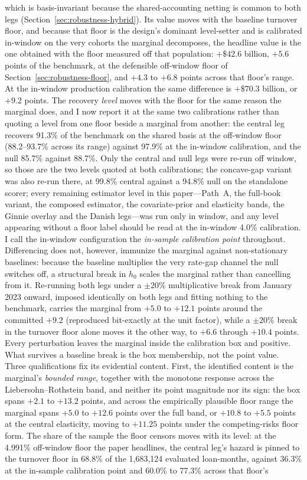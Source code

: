\documentclass[12pt]{article}
\begin{document}
which is basis-invariant because the shared-accounting netting is common to both legs (Section~\ref{sec:robustness-hybrid}). Its value moves with the baseline turnover floor, and because that floor is the design's dominant level-setter and is calibrated in-window on the very cohorts the marginal decomposes, the headline value is the one obtained with the floor measured off that population: $+\$42.6$ billion, $+5.6$ points of the benchmark, at the defensible off-window floor of Section~\ref{sec:robustness-floor}, and $+4.3$ to $+6.8$ points across that floor's range. At the in-window production calibration the same difference is $+\$70.3$ billion, or $+9.2$ points. The recovery \emph{level} moves with the floor for the same reason the marginal does, and I now report it at the same two calibrations rather than quoting a level from one floor beside a marginal from another: the central leg recovers 91.3\% of the benchmark on the shared basis at the off-window floor (88.2--93.7\% across its range) against 97.9\% at the in-window calibration, and the null 85.7\% against 88.7\%. Only the central and null legs were re-run off window, so those are the two levels quoted at both calibrations; the concave-gap variant was also re-run there, at 99.8\% central against a 94.8\% null on the standalone scorer; every remaining estimator level in this paper---Path~A, the full-book variant, the composed estimator, the covariate-prior and elasticity bands, the Ginnie overlay and the Danish legs---was run only in window, and any level appearing without a floor label should be read at the in-window 4.0\% calibration. I call the in-window configuration the \emph{in-sample calibration point} throughout. Differencing does not, however, immunize the marginal against non-stationary baselines: because the baseline multiplies the very rate-gap channel the null switches off, a structural break in $h_0$ scales the marginal rather than cancelling from it. Re-running both legs under a $\pm 20\%$ multiplicative break from January 2023 onward, imposed identically on both legs and fitting nothing to the benchmark, carries the marginal from $+5.0$ to $+12.1$ points around the committed $+9.2$ (reproduced bit-exactly at the unit factor), while a $\pm 20\%$ break in the turnover floor alone moves it the other way, to $+6.6$ through $+10.4$ points. Every perturbation leaves the marginal inside the calibration box and positive. What survives a baseline break is the box membership, not the point value. Three qualifications fix its evidential content. First, the identified content is the marginal's \emph{bounded range}, together with the monotone response across the Liebersohn--Rothstein band, and neither its point magnitude nor its sign: the box spans $+2.1$ to $+13.2$ points, and across the empirically plausible floor range the marginal spans $+5.0$ to $+12.6$ points over the full band, or $+10.8$ to $+5.5$ points at the central elasticity, moving to $+11.25$ points under the competing-risks floor form. The share of the sample the floor censors moves with its level: at the 4.991\% off-window floor the paper headlines, the central leg's hazard is pinned to the turnover floor in 68.8\% of the 1,683,124 evaluated loan-months, against 36.3\% at the in-sample calibration point and 60.0\% to 77.3\% across that floor's 
\end{document}
